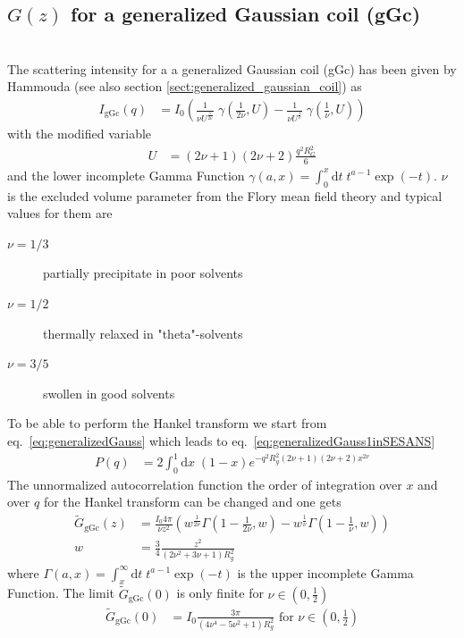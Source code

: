 \subsection{$G(z)$ for a generalized Gaussian coil (gGc) }~\\
\label{sec:Gz_gGc}
The scattering intensity for a a generalized Gaussian coil (gGc) has been given by  Hammouda \cite{Hammouda,Hammouda2012,Hammouda1993,Hammouda2016} (see also section \ref{sect:generalized_gaussian_coil}) as
\begin{align}
I_\text{gGc}(q) &= I_0
\left(
\frac{1}{\nu U^{\frac{1}{2 \nu}}} \; \gamma\left(\frac{1}{2 \nu},U\right)-
\frac{1}{\nu U^{\frac{1}{  \nu}}} \; \gamma\left(\frac{1}{  \nu},U\right)
\right)
\label{eq:generalizedGauss1inSESANS}
\end{align}
with the modified variable
\begin{align}
U&= \left(2\nu+1\right)\left(2\nu+2\right)\frac{q^2R_G^2}{6}
\end{align}
and the lower incomplete Gamma Function $\gamma(a,x) = \int_0^x \mathrm{d}t \; t^{a-1} \exp(-t)$.
$\nu$ is the excluded volume parameter from the Flory mean field theory and typical values for them are
\begin{description}
\item[$\nu=1/3$] partially precipitate in poor solvents
\item[$\nu=1/2$] thermally relaxed in "theta"-solvents
\item[$\nu=3/5$] swollen in good solvents
\end{description}
To be able to perform the Hankel transform we start from eq.\ \ref{eq:generalizedGauss} which leads to eq.\ \ref{eq:generalizedGauss1inSESANS}
\begin{align}
P(q) &= 2\int_0^1 \mathrm{d}x \; (1-x)e^{-q^2R_g^2(2\nu+1)(2\nu+2)x^{2\nu}}
\label{eq:generalizedGaussinSESANS}
\end{align}
The unnormalized autocorrelation function the order of integration over $x$ and  over $q$ for the Hankel transform can be changed and one gets
\begin{align}
\tilde{G}_\mathrm{gGc}(z) &=
 \frac{I_0 4\pi}{\nu z^2} \left(
   w^{\frac{1}{2\nu}} \Gamma \left(1-\frac{1}{2 \nu },w\right) - w^{\frac{1}{\nu }} \Gamma \left(1-\frac{1}{\nu },w\right) \right)\\
   w &= \frac34 \frac{z^2}{\left(2 \nu ^2+3 \nu +1\right) R_g^2}
\end{align}
where $\Gamma(a,x) = \int_x^\infty \mathrm{d}t \; t^{a-1} \exp(-t)$ is the upper incomplete Gamma Function.
The limit $\tilde{G}_\mathrm{gGc}(0)$ is only finite for $\nu \in \left(0,\frac12\right)$
\begin{align}
\tilde{G}_\mathrm{gGc}(0) &= I_0 \frac{3 \pi }{\left(4 \nu ^4-5 \nu ^2+1\right) R_g^2} \mbox{~for~} \nu \in \left(0,\frac12\right)
\end{align} 